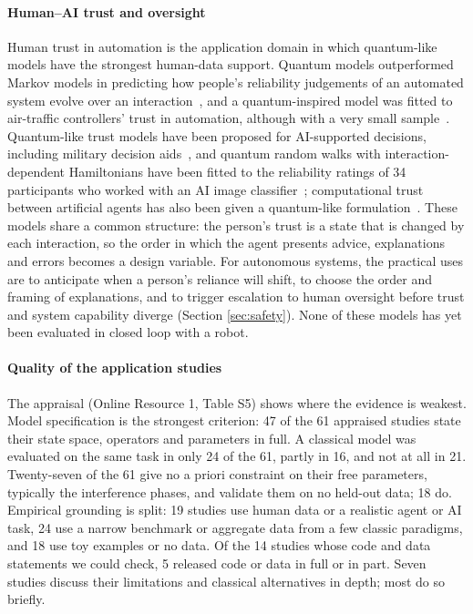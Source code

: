 \documentclass[pdflatex,sn-basic]{sn-jnl}
\begin{document}
\paragraph{Human--AI trust and oversight} Human trust in automation is the application domain in which quantum-like models have the strongest human-data support. Quantum models outperformed Markov models in predicting how people's reliability judgements of an automated system evolve over an interaction~\citep{Roeder2023}, and a quantum-inspired model was fitted to air-traffic controllers' trust in automation, although with a very small sample~\citep{Pushparaj2021}. Quantum-like trust models have been proposed for AI-supported decisions, including military decision aids~\citep{Humr2023,Humr2025,Humr2026}, and quantum random walks with interaction-dependent Hamiltonians have been fitted to the reliability ratings of 34 participants who worked with an AI image classifier~\citep{vanderMeer2025}; computational trust between artificial agents has also been given a quantum-like formulation~\citep{Ashtiani2019}. These models share a common structure: the person's trust is a state that is changed by each interaction, so the order in which the agent presents advice, explanations and errors becomes a design variable. For autonomous systems, the practical uses are to anticipate when a person's reliance will shift, to choose the order and framing of explanations, and to trigger escalation to human oversight before trust and system capability diverge (Section \ref{sec:safety}). None of these models has yet been evaluated in closed loop with a robot.

\paragraph{Quality of the application studies} The appraisal (Online Resource 1, Table S5) shows where the evidence is weakest. Model specification is the strongest criterion: 47 of the 61 appraised studies state their state space, operators and parameters in full. A classical model was evaluated on the same task in only 24 of the 61, partly in 16, and not at all in 21. Twenty-seven of the 61 give no a priori constraint on their free parameters, typically the interference phases, and validate them on no held-out data; 18 do. Empirical grounding is split: 19 studies use human data or a realistic agent or AI task, 24 use a narrow benchmark or aggregate data from a few classic paradigms, and 18 use toy examples or no data. Of the 14 studies whose code and data statements we could check, 5 released code or data in full or in part. Seven studies discuss their limitations and classical alternatives in depth; most do so briefly.
\end{document}
